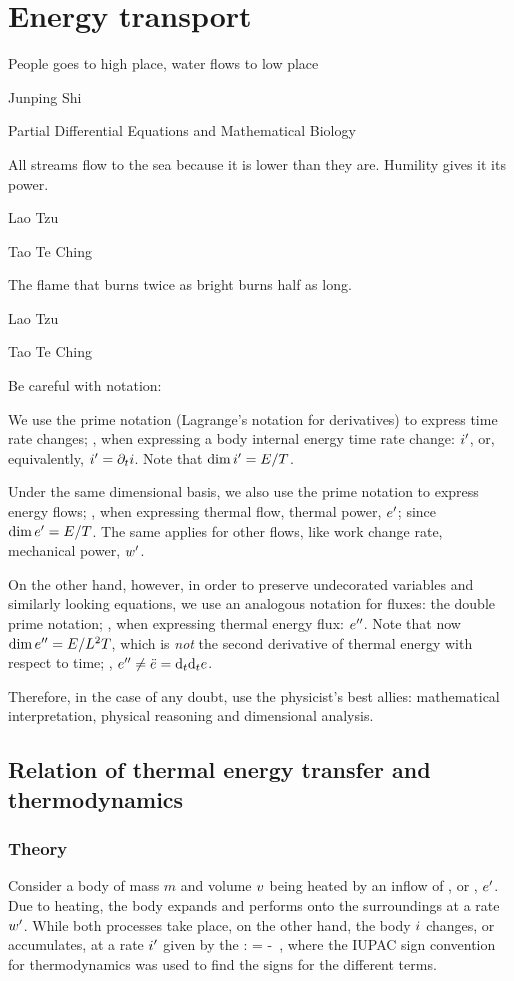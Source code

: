 \section{Energy transport}
\epigraph{People goes to high place, water flows to low place}{Junping Shi}
    {Partial Differential Equations and Mathematical Biology}
\epigraph{All streams flow to the sea because it is lower than they are. Humility gives it its power.}{Lao Tzu}{Tao Te Ching}
\epigraph{The flame that burns twice as bright burns half as long.}{Lao Tzu}{Tao Te Ching}

Be careful with notation:

\begin{caution}
We use the prime notation (Lagrange's notation for derivatives) to express time rate changes; \eg, when expressing a body internal energy time rate change: ${i}^{\prime}$, or, equivalently, ${i}^{\prime} = \partial_{t}i$. Note that $\dim{i}^{\prime} = E/T$.

Under the same dimensional basis, we also use the prime notation to express energy flows; \eg, when expressing thermal flow, \aka thermal power, ${e}^{\prime}$; since $\dim{e}^{\prime} = E/T$. The same applies for other flows, like work change rate, \aka mechanical power, ${w}^{\prime}$.

On the other hand, however, in order to preserve undecorated variables and similarly looking equations, we use an analogous notation for fluxes: the double prime notation; \eg, when expressing thermal energy flux: ${e}^{\prime\prime}$. Note that now $\dim{e}^{\prime\prime} = E/L^2T$, which is \emph{not} the second derivative of thermal energy with respect to time; \ie, ${e}^{\prime\prime} \neq \ddot{e} = \text{d}_{t}{\text{d}_{t}e}$.

Therefore, in the case of any doubt, use the physicist's best allies: mathematical interpretation, physical reasoning and dimensional analysis.
\end{caution}


\subsection{Relation of thermal energy transfer and thermodynamics}

\subsubsection{Theory}
Consider a body of mass $m$ and volume $v$ being heated by an inflow of , \aka {} or , ${e}^{\prime}$. Due to heating, the body expands and performs  onto the surroundings at a rate ${w}^{\prime}$. While both processes take place, on the other hand, the body  $i$ changes, or accumulates, at a rate ${i}^{\prime}$ given by the :
\beq
\rate\ien = \flow\then - \flow\work\,,
\eeq
where the IUPAC sign convention for thermodynamics was used to find the signs for the different terms.

